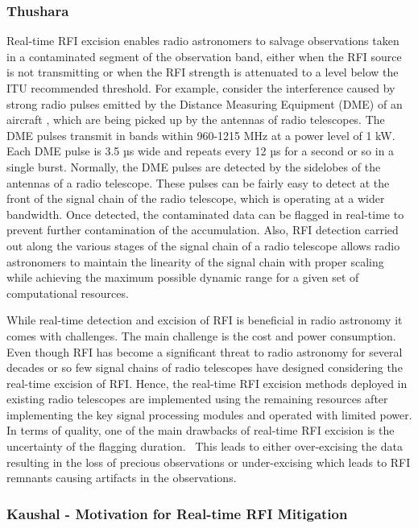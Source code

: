\subsubsection{Thushara}
Real-time RFI excision enables radio astronomers to salvage observations taken in a contaminated segment of the observation band, either when the RFI source is not transmitting or when the RFI strength is attenuated to a level below the ITU recommended threshold\citep{ITU_protection_2003}. For example, consider the interference caused by strong radio pulses emitted by the Distance Measuring Equipment (DME) of an aircraft \cite{wiki_dme_2024}, which are being picked up by the antennas of radio telescopes. The DME pulses transmit in bands within 960-1215 MHz at a power level of 1 kW. Each DME pulse is 3.5 µs wide and repeats every 12 µs for a second or so in a single burst. Normally, the DME pulses are detected by the sidelobes of the antennas of a radio telescope. These pulses can be fairly easy to detect at the front of the signal chain of the radio telescope, which is operating at a wider bandwidth. Once detected, the contaminated data can be flagged in real-time to prevent further contamination of the accumulation. Also, RFI detection carried out along the various stages of the signal chain of a radio telescope allows radio astronomers to maintain the linearity of the signal chain with proper scaling while achieving the maximum possible dynamic range for a given set of computational resources.

While real-time detection and excision of RFI is beneficial in radio astronomy it comes with challenges. The main challenge is the cost and power consumption. Even though RFI has become a significant threat to radio astronomy for several decades or so few signal chains of radio telescopes have designed considering the real-time excision of RFI. Hence, the real-time RFI excision methods deployed in existing radio telescopes are implemented using the remaining resources after implementing the key signal processing modules and operated with limited power. In terms of quality, one of the main drawbacks of real-time RFI excision is the uncertainty of the flagging duration.  This leads to either over-excising the data resulting in the loss of precious observations or under-excising which leads to RFI remnants causing artifacts in the observations. 

\subsubsection{Kaushal - Motivation for Real-time RFI Mitigation}

